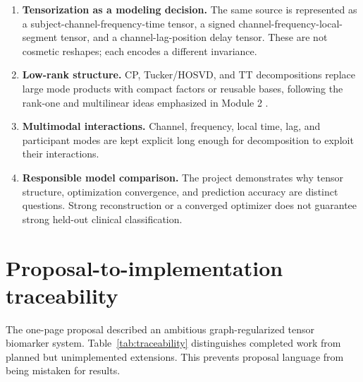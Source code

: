 \begin{enumerate}
  \item \textbf{Tensorization as a modeling decision.} The same \EEG{} source is
  represented as a subject-channel-frequency-time tensor, a signed
  channel-frequency-local-segment tensor, and a channel-lag-position delay
  tensor. These are not cosmetic reshapes; each encodes a different invariance.
  \item \textbf{Low-rank structure.} CP, Tucker/HOSVD, and TT decompositions
  replace large mode products with compact factors or reusable bases, following
  the rank-one and multilinear ideas emphasized in Module 2
  \citep{padhy2026lowrank,kolda2009tensor,oseledets2011tt}.
  \item \textbf{Multimodal interactions.} Channel, frequency, local time, lag,
  and participant modes are kept explicit long enough for decomposition to
  exploit their interactions.
  \item \textbf{Responsible model comparison.} The project demonstrates why
  tensor structure, optimization convergence, and prediction accuracy are
  distinct questions. Strong reconstruction or a converged optimizer does not
  guarantee strong held-out clinical classification.
\end{enumerate}

\section{Proposal-to-implementation traceability}

The one-page proposal described an ambitious graph-regularized tensor biomarker
system. Table~\ref{tab:traceability} distinguishes completed work from planned
but unimplemented extensions. This prevents proposal language from being
mistaken for results.

